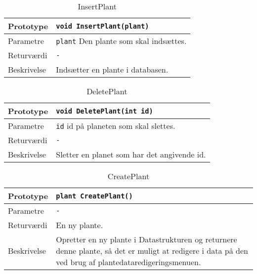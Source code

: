 \begin{table}[h]
\begin{tabularx}{\textwidth}{| L{2.5 cm} | Z |} \hline
Prototype & \texttt{void InsertPlant(plant)} \\\hline
Parametre & \texttt{plant} \newline
Den plante som skal indsættes. \\\hline
Returværdi & \texttt{-} \\\hline
Beskrivelse & Indsætter en plante i databasen. \\\hline
\end{tabularx}
\caption{InsertPlant}
\label{table:Plantedatabase_InsertPlant}
\end{table}

\clearpage

\begin{table}[h]
\begin{tabularx}{\textwidth}{| L{2.5 cm} | Z |} \hline
Prototype & \texttt{void DeletePlant(int id)} \\\hline
Parametre & \texttt{id} \newline
id på planeten som skal slettes. \\\hline
Returværdi & \texttt{-} \\\hline
Beskrivelse & Sletter en planet som har det angivende id. \\\hline
\end{tabularx}
\caption{DeletePlant}
\label{table:Plantedatabase_DeletePlant}
\end{table}

\begin{table}[h]
\begin{tabularx}{\textwidth}{| L{2.5 cm} | Z |} \hline
Prototype & \texttt{plant CreatePlant()} \\\hline
Parametre & \texttt{-} \\\hline
Returværdi & En ny plante. \\\hline
Beskrivelse & Opretter en ny plante i Datastrukturen og returnere denne plante, så det er muligt at redigere i data på den ved brug af plantedataredigeringsmenuen. \\\hline
\end{tabularx}
\caption{CreatePlant}
\label{table:Plantedatabase_CreatePlant}
\end{table}